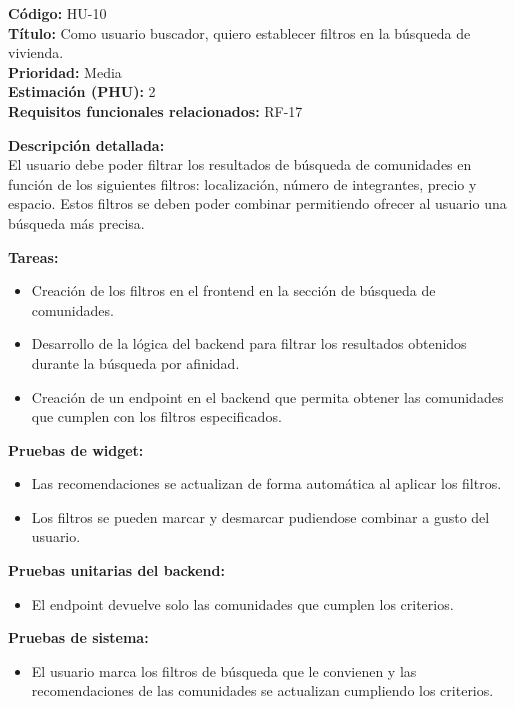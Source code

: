 \begin{tarjetaHU}
\textbf{Código:} HU-10 \\
\textbf{Título:} Como usuario buscador, quiero establecer filtros en la búsqueda de vivienda. \\
\textbf{Prioridad:} Media \\
\textbf{Estimación (PHU):} 2 \\
\textbf{Requisitos funcionales relacionados:} RF-17

\vspace{0.5em}
\textbf{Descripción detallada:} \\
El usuario debe poder filtrar los resultados de búsqueda de comunidades en función de los siguientes filtros: localización, número de integrantes, precio y espacio. Estos filtros se deben poder combinar permitiendo ofrecer al usuario una búsqueda más precisa.

\vspace{0.5em}
\textbf{Tareas:}
\begin{itemize}[left=0pt]
  \item Creación de los filtros en el frontend en la sección de búsqueda de comunidades. 
  \item Desarrollo de la lógica del backend para filtrar los resultados obtenidos durante la búsqueda por afinidad.
  \item Creación de un endpoint en el backend que permita obtener las comunidades que cumplen con los filtros especificados.
\end{itemize}

\vspace{0.5em}
\textbf{Pruebas de widget:}
\begin{itemize}[left=0pt]
  \item Las recomendaciones se actualizan de forma automática al aplicar los filtros.
  \item Los filtros se pueden marcar y desmarcar pudiendose combinar a gusto del usuario.
\end{itemize}
\textbf{Pruebas unitarias del backend:}
\begin{itemize}[left=0pt]
  \item El endpoint devuelve solo las comunidades que cumplen los criterios.
\end{itemize}
\textbf{Pruebas de sistema:}
\begin{itemize}[left=0pt]
  \item El usuario marca los filtros de búsqueda que le convienen y las recomendaciones de las comunidades se actualizan cumpliendo los criterios.
\end{itemize}
\end{tarjetaHU}


